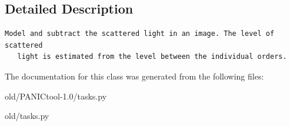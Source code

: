 \subsection{Detailed Description}


\footnotesize\begin{verbatim}Model and subtract the scattered light in an image. The level of scattered
   light is estimated from the level between the individual orders.
\end{verbatim}
\normalsize
 



The documentation for this class was generated from the following files:\begin{CompactItemize}
\item 
old/PANICtool-1.0/tasks.py\item 
old/tasks.py\end{CompactItemize}
